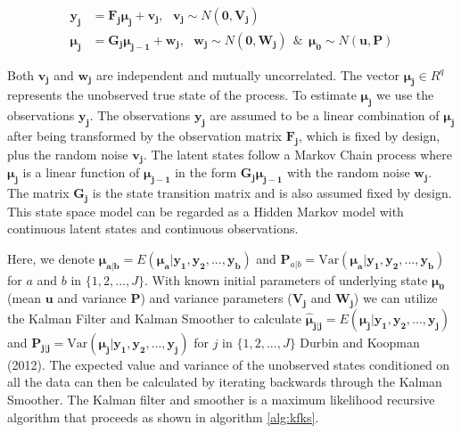 \documentclass[
]{article}
\begin{document}
\begin{equation}
\begin{aligned}\label{GSSM}
\boldsymbol{y_j} &= \boldsymbol{F_j}\boldsymbol{\mu_j} + \boldsymbol{v_j}, \ \ \ \boldsymbol{v_j} \sim N(\boldsymbol{0}, \boldsymbol{V_j})\\
\boldsymbol{\mu_j} &= \boldsymbol{G_j}\boldsymbol{\mu_{j-1}} + \boldsymbol{w_j}, \ \ \ \boldsymbol{w_j} \sim N(\boldsymbol{0},\boldsymbol{W_j}) \ \ \& \ \ \boldsymbol{\mu_0} \sim N(\boldsymbol{u}, \boldsymbol{P})
\end{aligned}
\end{equation}

Both \(\boldsymbol{v_j}\) and \(\boldsymbol{w_j}\) are independent and mutually uncorrelated. The vector \(\boldsymbol{\mu_j} \in R^q\) represents the unobserved true state of the process. To estimate \(\boldsymbol{\mu_j}\) we use the observations \(\boldsymbol{y_j}\). The observations \(\boldsymbol{y_j}\) are assumed to be a linear combination of \(\boldsymbol{\mu_j}\) after being transformed by the observation matrix \(\boldsymbol{F_j}\), which is fixed by design, plus the random noise \(\boldsymbol{v_j}\). The latent states follow a Markov Chain process where \(\boldsymbol{\mu_j}\) is a linear function of \(\boldsymbol{\mu_{j-1}}\) in the form \(\boldsymbol{G_j}\boldsymbol{\mu_{j-1}}\) with the random noise \(\boldsymbol{w_j}\). The matrix \(\boldsymbol{G_j}\) is the state transition matrix and is also assumed fixed by design. This state space model can be regarded as a Hidden Markov model with continuous latent states and continuous observations.

Here, we denote \(\boldsymbol{\hat\mu_{a|b}} = E(\boldsymbol{\mu_a}|\boldsymbol{y_1, y_2, ..., y_b})\) and \(\boldsymbol{P}_{a|b} = \text{Var}(\boldsymbol{\mu_a}|\boldsymbol{y_1, y_2, ..., y_b})\) for \(a\) and \(b\) in \(\{1, 2, ..., J\}\). With known initial parameters of underlying state \(\boldsymbol{\mu_0}\) (mean \(\boldsymbol{u}\) and variance \(\boldsymbol{P}\)) and variance parameters (\(\boldsymbol{V_j}\) and \(\boldsymbol{W_j}\)) we can utilize the Kalman Filter and Kalman Smoother to calculate \(\boldsymbol{\hat{\mu}_{j|j}} = E(\boldsymbol{\mu_j}|\boldsymbol{y_1}, \boldsymbol{y_2}, ..., \boldsymbol{y_j})\) and \(\boldsymbol{P_{j|j}} = \text{Var}(\boldsymbol{\mu_j}|\boldsymbol{y_1}, \boldsymbol{y_2}, ..., \boldsymbol{y_j})\) for \(j\) in \(\{1, 2, ..., J\}\) Durbin and Koopman (2012). The expected value and variance of the unobserved states conditioned on all the data can then be calculated by iterating backwards through the Kalman Smoother. The Kalman filter and smoother is a maximum likelihood recursive algorithm that proceeds as shown in algorithm \ref{alg:kfks}.
\end{document}
